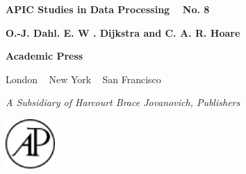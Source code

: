 \pagecolor{desertstorm}\afterpage{\nopagecolor}
{
	\color{shadesofmidnight}
	\sffamily
	\textbf{APIC Studies in Data Processing}~~ \textbf{No. 8}
	\vspace*{3em}
	
	\medskip
	
	\vspace*{3em}
	
	{
		\large
		\textbf{O.-J. Dahl. E. W . Dijkstra and C. A. R. Hoare}
	}
	
	\vfill
	
	 \begin{minipage}[position]{9cm}
	 	\vspace{-3em}
	 	
	 	\bfseries\Large Academic Press
	 	
	 	London ~ New York ~ San Francisco
	 	
	 	\normalfont\normalsize\sffamily
	 	\textit{A Subsidiary of Harcourt Brace Jovanovich, Publishers}
	\end{minipage}
	\hfill\includegraphics[width=0.14\textwidth]{./images/academic-press.pdf}
}
